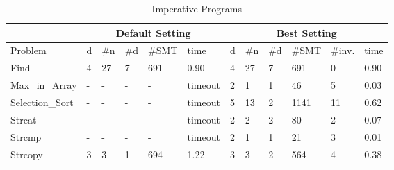 \documentclass{LMCS}
\theoremstyle{plain}\newtheorem{assumption}[thm]{Assumption}
\theoremstyle{plain}\newtheorem{proposition}[thm]{Proposition}
\theoremstyle{plain}\newtheorem{property}[thm]{Property}
\theoremstyle{plain}\newtheorem{example}[thm]{Example}
\theoremstyle{plain}\newtheorem{claim}[thm]{Claim}
\theoremstyle{plain}\newtheorem{lemma}[thm]{Lemma}
\begin{document}
\begin{table}[b]
\small
\caption{\label{subapp:ip}Imperative Programs}
\begin{tabular}{||l|l|l|l|l|l||l|l|l|l|l|l||}
\hline\hline
& \multicolumn{5}{|c||}{Default Setting} & 
  \multicolumn{6}{|c||}{Best Setting} \\ \hline
Problem  & d & \#n & \#d & \#SMT & time 
         & d & \#n & \#d & \#SMT & \#inv. & time \\ \hline\hline
Find & 	4 & 	27 & 	7 & 	691 & 	0.90 
     & 	4 & 	27 & 	7 & 	691 & 	0 & 	0.90 \\ \hline
Max\_in\_Array & 	- & 	- & 	- & 	- & 	timeout 
               & 	2 & 	1 & 	1 & 	46 & 	5 & 	0.03 \\ \hline
Selection\_Sort & 	- & 	- & 	- & 	- & 	timeout 
                & 	5 & 	13 & 	2 & 	1141 & 	11 & 	0.62 \\ \hline
Strcat & 	- & 	- & 	- & 	- & 	timeout
       & 	2 & 	2 & 	2 & 	80 & 	2 & 	0.07 \\ \hline
Strcmp & 	- & 	- & 	- & 	- & 	timeout 
       & 	2 & 	1 & 	1 & 	21 & 	3 & 	0.01 \\ \hline
Strcopy & 	3 & 	3 & 	1 & 	694 & 	1.22 
        & 	3 & 	3 & 	2 & 	564 & 	4 & 	0.38 \\ \hline\hline
\end{tabular}
\end{table}
\end{document}
